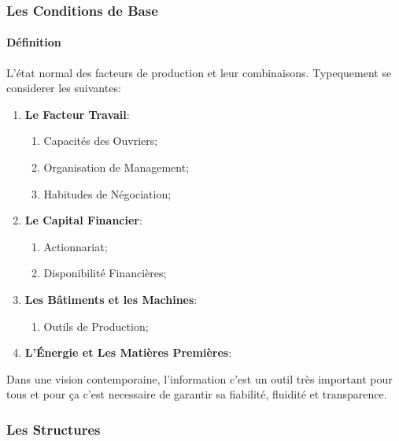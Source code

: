 \documentclass{article}
\begin{document}
\subsubsection{Les Conditions de Base}
\paragraph{Définition}L'état normal des facteurs de production et leur combinaisons. Typequement se considerer les suivantes:
\begin{enumerate}
    \item \textbf{Le Facteur Travail}:
    \begin{enumerate}[noitemsep]
        \item Capacités des Ouvriers;
        \item Organisation de Management;
        \item Habitudes de Négociation;
    \end{enumerate}

    \item \textbf{Le Capital Financier}:
    \begin{enumerate}[noitemsep]
        \item Actionnariat;
        \item Disponibilité Financières;
    \end{enumerate}

    \item \textbf{Les Bâtiments et les Machines}:
    \begin{enumerate}[noitemsep]
        \item Outils de Production;
    \end{enumerate}

    \item \textbf{L'Énergie et Les Matières Premières}:
\end{enumerate}
Dans une vision contemporaine, l'information c'est un outil très important pour tous et pour ça c'est necessaire de garantir sa fiabilité, fluidité et transparence.

\subsubsection{Les Structures}
\end{document}
